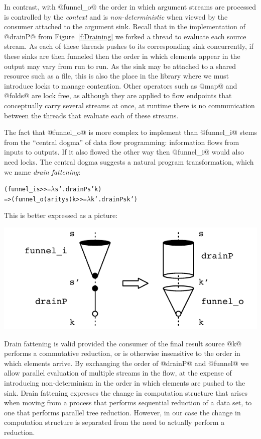 In contrast, with @funnel_o@ the order in which argument streams are processed is controlled by the \emph{context} and is \emph{non-deterministic} when viewed by the consumer attached to the argument sink. Recall that in the implementation of @drainP@ from Figure~\ref{f:Draining} we forked a thread to evaluate each source stream. As each of these threads pushes to its corresponding sink concurrently, if these sinks are then funneled then the order in which elements appear in the output may vary from run to run. As the sink may be attached to a shared resource such as a file, this is also the place in the library where we must introduce locks to manage contention. Other operators such as @map@ and @folds@ are lock free, as although they are applied to flow endpoints that conceptually carry several streams at once, at runtime there is no communication between the threads that evaluate each of these streams.

The fact that @funnel_o@ is more complex to implement than @funnel_i@ stems from the ``central dogma'' of data flow programming: information flows from inputs to outputs. If it also flowed the other way then @funnel_i@ would also need locks. The central dogma suggests a natural program transformation, which we name \emph{drain fattening}:
\begin{alltt}
    (funnel_i           s >>= \(\lambda\)s'. drainP s' k)
 => (funnel_o (arity s) k >>= \(\lambda\)k'. drainP s  k')
\end{alltt}

This is better expressed as a picture:
\begin{center}
\includegraphics[scale=0.8]{figures/drain-fatten.pdf}
\end{center}

Drain fattening is valid provided the consumer of the final result source @k@ performs a commutative reduction, or is otherwise insensitive to the order in which elements arrive. By exchanging the order of @drainP@ and @funnel@ we allow parallel evaluation of multiple streams in the flow, at the expense of introducing non-determinism in the order in which elements are pushed to the sink. Drain fattening expresses the change in computation structure that arises when moving from a process that performs sequential reduction of a data set, to one that performs parallel tree reduction. However, in our case the change in computation structure is separated from the need to actually perform a reduction.

